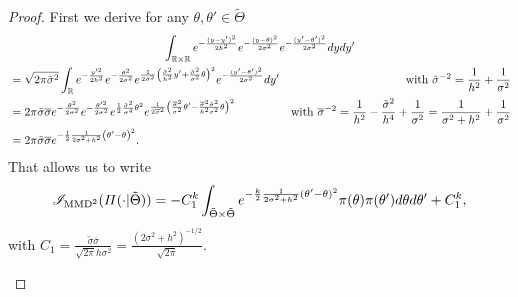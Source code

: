 \begin{proof}
    




    First we derive for any $\theta,\theta'\in\tilde\Theta$
            \begin{multline}
                \int_{\mathbb{R}\times\mathbb{R}} e^{-\frac{(y-y')^2}{2h^2}} e^{-\frac{(y-\theta)^2}{2\sigma^2} } e^{-\frac{(y'-\theta')^2}{2\sigma^2} }  d yd y' 
                    \\
                    \begin{aligned}
                        &= \sqrt{2\pi\tilde\sigma^2}\int_{\mathbb{R}} e^{-\frac{y'^2}{2h^2}}e^{-\frac{\theta^2}{2\sigma^2}} e^{\frac{1}{2\tilde\sigma^2}\left( \frac{\tilde\sigma^2}{h^2}y'+\frac{\tilde\sigma^2}{\sigma^2}\theta \right)^2} e^{-\frac{(y'-\theta')^2}{2\sigma^2}}dy'
                        &\mbox{with }\tilde\sigma^{-2}=\frac{1}{h^2}+\frac{1}{\sigma^2}\\
                    & = 2\pi\tilde\sigma\overline\sigma
                    e^{-\frac{\theta^2}{2\sigma^2}} e^{-\frac{\theta'^2}{2\sigma^2}} e^{\frac{1}{2}\frac{\tilde\sigma^2}{\sigma^4}\theta^2} e^{\frac{1}{2\overline\sigma^2}\left(\frac{\overline\sigma^2}{\sigma^2}\theta' - \frac{\overline\sigma^2\tilde\sigma^2}{h^2\sigma^2}\theta\right)^2} 
                        &\mbox{with }\overline\sigma^{-2}= \frac{1}{h^2} - \frac{\tilde\sigma^2}{h^4} + \frac{1}{\sigma^2} = \frac{1}{\sigma^2+h^2}+\frac{1}{\sigma^2}\\
                    &= 2\pi\tilde\sigma\overline\sigma e^{-\frac{1}{2}\frac{1}{2\sigma^2+h^2}\left(\theta' - \theta\right)^2}. 
                    \end{aligned}
            \end{multline}
        That allows us to write
    \begin{equation}\label{eq:PSGSA:expr2IMMD}
        \mathscr{I}_{\text{MMD}^2}(\varPi(\cdot|\tilde\Theta)) = - C_1^k\int_{\tilde\Theta\times\tilde\Theta} e^{-\frac{k}{2}\frac{1}{2\sigma^2+h^2}(\theta'-\theta)^2}\pi(\theta)\pi(\theta')d\theta d\theta' + C_1^k,
    \end{equation}
with $C_1=\frac{\tilde\sigma\overline{\sigma}}{\sqrt{2\pi}h\sigma^2} = \frac{(2\sigma^2+h^2)^{-1/2}}{\sqrt{2\pi}}$. %
 \begin{enumerate}

\end{enumerate}
\end{proof}
